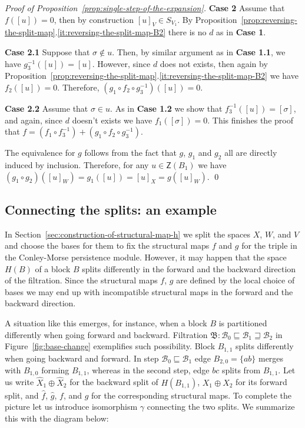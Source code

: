 \documentclass[letterpaper,11pt]{article}
\theoremstyle{plain}
\theoremstyle{definition}
\def\cB{\text{$\mathcal B$}}
\newcounter{li}
\newcommand{\inscr}{\sqsubseteq}
\newcommand{\ovscr}{\sqsupseteq}
\newcommand{\Zgroup}{\mathsf{Z}}
\newcommand{\zzBD}{\mathfrak{B}}
\newcommand{\bl}{B}
\begin{document}
\begin{proof}[Proof of Proposition~\ref{prop:single-step-of-the-expansion}]
    \textbf{Case 2} Assume that $f([u])=0$, then by construction $[u]_V\in S_{V_1}$.
       By Proposition~\ref{prop:reversing-the-split-map}.\ref{it:reversing-the-split-map-B2} there is no $d$ as in \textbf{Case 1}.
       
    \textbf{Case 2.1} 
        Suppose that $\sigma\not\in u$.
        Then, by similar argument as in \textbf{Case 1.1}, we have $g_3^{-1}([u])=[u]$.
        However, since $d$ does not exists, then again by 
            Proposition~\ref{prop:reversing-the-split-map}.\ref{it:reversing-the-split-map-B2}
            we have $f_2([u])=0$.
        Therefore, $(g_1\circ f_2\circ g_3^{-1})([u])=0$.
        
    \textbf{Case 2.2} 
        Assume that $\sigma\in u$.
        As in \textbf{Case 1.2} we show that $f_3^{-1}([u])=[\sigma]$, 
            and again, since $d$ doesn't exists we have $f_1([\sigma])=0$.
        This finishes the proof that $f=(f_1\circ f_3^{-1}) + (g_1\circ f_2\circ g_3^{-1})$.

    The equivalence for $g$ follows from the fact that $g$, $g_1$ and $g_2$ all are directly induced by inclusion.
    Therefore, for any $u\in\Zgroup(B_1)$ we have $(g_1\circ g_2)([u]_W)=g_1([u])=[u]_X = g([u]_W)$.
    \qed
\end{proof}

\subsection{Connecting the splits: an example}
    \label{sec:appendix_connecting_the_splits}

In Section~\ref{sec:construction-of-structural-map-h} 
    we split the spaces $X$, $W$, and $V$ 
    and choose the bases for them to fix the structural maps $f$ and $g$ for the triple in the Conley-Morse persistence module.
However, it may happen that the space $H(\bl)$ of a block $B$ splits differently in the forward and the backward direction of the filtration.
Since the structural maps $f$, $g$ are defined by the local choice of bases
    we may end up with incompatible structural maps in the forward and the backward direction.

A situation like this emerges, for instance, when a block $B$ is partitioned differently when going forward and backward.
Filtration $\zzBD:\cB_0\inscr\cB_1\ovscr\cB_2$ in Figure~\ref{fig:base-change} exemplifies such possibility.
Block $\bl_{1,1}$ splits differently when going backward and forward.
In step $\cB_0\inscr\cB_1$ edge $\bl_{2,0}=\{ab\}$ merges with $\bl_{1,0}$ forming $\bl_{1,1}$,
    whereas in the second step, edge $bc$ splits from $\bl_{1,1}$.
Let us write $\hat{X}_1\oplus \hat{X}_2$ for the backward split of $H(\bl_{1,1})$, $X_1\oplus X_2$ for its forward split, and $\hat{f}$, $\hat{g}$, $f$, and $g$ for the corresponding structural maps.
To complete the picture let us introduce isomorphism $\gamma$ connecting the two splits.
We summarize this with the diagram below:
\end{document}
